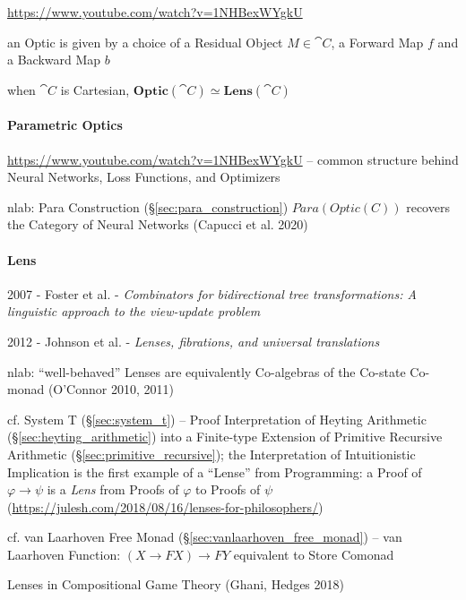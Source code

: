 \asterism

\url{https://www.youtube.com/watch?v=1NHBexWYgkU}

an Optic is given by a choice of a Residual Object $M \in \cat{C}$, a Forward
Map $f$ and a Backward Map $b$

when $\cat{C}$ is Cartesian,
$\mathbf{Optic}(\cat{C}) \simeq \mathbf{Lens}(\cat{C})$



\paragraph{Parametric Optics}\label{sec:parametric_optics}\hfill

\url{https://www.youtube.com/watch?v=1NHBexWYgkU} -- common structure behind
Neural Networks, Loss Functions, and Optimizers

nlab: Para Construction (\S\ref{sec:para_construction}) $Para(Optic(C))$
recovers the Category of Neural Networks (Capucci et al. 2020)



\paragraph{Lens}\label{sec:lens}\hfill

2007 - Foster et al. - \emph{Combinators for bidirectional tree transformations:
A linguistic approach to the view-update problem}

2012 - Johnson et al. - \emph{Lenses, fibrations, and universal translations}

nlab: ``well-behaved'' Lenses are equivalently Co-algebras of the Co-state
Co-monad (O'Connor 2010, 2011)

\fist cf. System T (\S\ref{sec:system_t}) -- Proof Interpretation of Heyting
Arithmetic (\S\ref{sec:heyting_arithmetic}) into a Finite-type Extension of
Primitive Recursive Arithmetic (\S\ref{sec:primitive_recursive}); the
Interpretation of Intuitionistic Implication is the first example of a ``Lense''
from Programming: a Proof of $\varphi \rightarrow \psi$ is a \emph{Lens} from
Proofs of $\varphi$ to Proofs of $\psi$
(\url{https://julesh.com/2018/08/16/lenses-for-philosophers/})

\fist cf. van Laarhoven Free Monad (\S\ref{sec:vanlaarhoven_free_monad}) -- van
Laarhoven Function: $(X \rightarrow F X) \rightarrow F Y$ equivalent to Store
Comonad

Lenses in Compositional Game Theory (Ghani, Hedges 2018)



